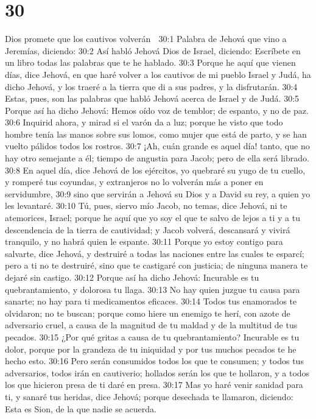 \chapter{30}

Dios promete que los cautivos volverán  

30:1 Palabra de Jehová que vino a Jeremías, diciendo:  
30:2 Así habló Jehová Dios de Israel, diciendo: Escríbete en un libro todas las palabras que te he hablado.  
30:3 Porque he aquí que vienen días, dice Jehová, en que haré volver a los cautivos de mi pueblo Israel y Judá, ha dicho Jehová, y los traeré a la tierra que di a sus padres, y la disfrutarán.  
30:4 Estas, pues, son las palabras que habló Jehová acerca de Israel y de Judá.  
30:5 Porque así ha dicho Jehová: Hemos oído voz de temblor; de espanto, y no de paz.  
30:6 Inquirid ahora, y mirad si el varón da a luz; porque he visto que todo hombre tenía las manos sobre sus lomos, como mujer que está de parto, y se han vuelto pálidos todos los rostros.  
30:7 ¡Ah, cuán grande es aquel día! tanto, que no hay otro semejante a él; tiempo de angustia para Jacob; pero de ella será librado.  
30:8 En aquel día, dice Jehová de los ejércitos, yo quebraré su yugo de tu cuello, y romperé tus coyundas, y extranjeros no lo volverán más a poner en servidumbre,  
30:9 sino que servirán a Jehová su Dios y a David su rey, a quien yo les levantaré.  
30:10 Tú, pues, siervo mío Jacob, no temas, dice Jehová, ni te atemorices, Israel; porque he aquí que yo soy el que te salvo de lejos a ti y a tu descendencia de la tierra de cautividad; y Jacob volverá, descansará y vivirá tranquilo, y no habrá quien le espante.  
30:11 Porque yo estoy contigo para salvarte, dice Jehová, y destruiré a todas las naciones entre las cuales te esparcí; pero a ti no te destruiré, sino que te castigaré con justicia; de ninguna manera te dejaré sin castigo. 
30:12 Porque así ha dicho Jehová: Incurable es tu quebrantamiento, y dolorosa tu llaga.  
30:13 No hay quien juzgue tu causa para sanarte; no hay para ti medicamentos eficaces.  
30:14 Todos tus enamorados te olvidaron; no te buscan; porque como hiere un enemigo te herí, con azote de adversario cruel, a causa de la magnitud de tu maldad y de la multitud de tus pecados.  
30:15 ¿Por qué gritas a causa de tu quebrantamiento? Incurable es tu dolor, porque por la grandeza de tu iniquidad y por tus muchos pecados te he hecho esto.  
30:16 Pero serán consumidos todos los que te consumen; y todos tus adversarios, todos irán en cautiverio; hollados serán los que te hollaron, y a todos los que hicieron presa de ti daré en presa.  
30:17 Mas yo haré venir sanidad para ti, y sanaré tus heridas, dice Jehová; porque desechada te llamaron, diciendo: Esta es Sion, de la que nadie se acuerda.  
